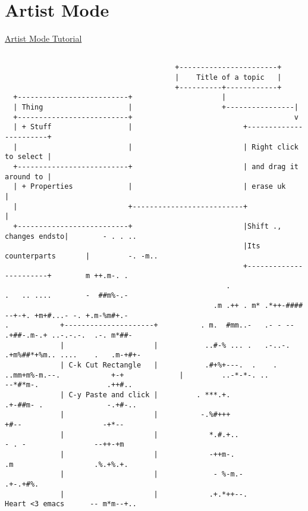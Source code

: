 \documentclass[11pt]{article}
\begin{document}
\section{Artist Mode}
\label{sec:org0262dfe}
\href{https://www.youtube.com/watch?v=cIuX87Xo8Fc}{Artist Mode Tutorial}
\begin{verbatim}

                                        +-----------------------+
                                        |    Title of a topic   |
                                        +----------+------------+
  +--------------------------+                     |
  | Thing                    |                     +----------------|
  +--------------------------+                                      v
  | + Stuff                  |                          +-----------------------+
  |                          |                          | Right click to select |
  +--------------------------+                          | and drag it around to |
  | + Properties             |                          | erase uk              |
  |                          +--------------------------+                       |
  +--------------------------+                          |Shift ., changes endsto|        - . . ..
                                                        |Its counterparts       |         -. -m..
                                                        +-----------------------+        m ++.m-. .
                                                    .                 .   .. ....        -  ##m%-.-
                                                 .m .++ . m* .*++-#### --+-+. +m+#...- -. +.m-%m#+.-
.            +---------------------+          . m.  #mm..-   .- - -- .+##-.m-.+ ..-.-.-.  .-. m*##-
             |                     |           ..#-% ... .   .-..-. .+m%##*+%m.. ....    .   .m-+#+-
             | C-k Cut Rectangle   |           .#+%+---.  .    .     ..mm+m%-m.--.            +-+             |         ..-*-*-. ..              --*#*m-.                .++#..
             | C-y Paste and click |         . ***.+.                 .+-##m- .               -.+#-..
             |                     |          -.%#+++                   +#--                   -+*--
             |                     |            *.#.+..                 - . -                --++-+m
             |                     |            -++m-.                 .m                   .%.+%.+.
             |                     |             - %-m.-                                  .+-.+#%.
             |                     |            .+.*++--.            Heart <3 emacs      -- m*m--+..

\end{verbatim}
\end{document}
